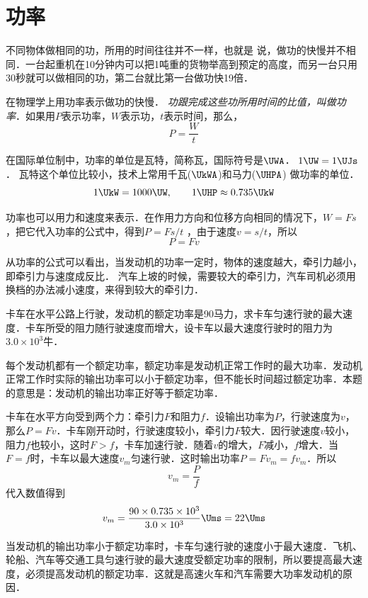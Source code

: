 \section{功率}

不同物体做相同的功，所用的时间往往并不一样，也就是
说，做功的快慢并不相同．一台起重机在10分钟内可以把1吨重的货物举高到预定的高度，而另一台只用30秒就可以做相同的功，第二台就比第一台做功快19倍．

在物理学上用功率表示做功的快慢．
\textit{功跟完成这些功所用时间的比值，叫做功率}．如果用$P$表示功率，$W$表示功，$t$表示时间，那么，
\[P=\frac{W}{t}\]

在国际单位制中，功率的单位是瓦特，简称瓦，国际符号是$\UWA$．
$1 \UW = 1 \UJs$．
瓦特这个单位比较小，技术上常用千瓦($\UkWA$)和马力($\UHPA$) %
做功率的单位．
\[1 \UkW=1000\UW,\qquad 1 \UHP \approx 0.735 \UkW \]

功率也可以用力和速度来表示．在作用力方向和位移方向相同的情况下，$W=Fs$，把它代入功率的公式中，得到$P=Fs/t$
，由于速度$v=s/t$，所以
\[P=Fv \]

从功率的公式可以看出，当发动机的功率一定时，物体的速度越大，牵引力越小，即牵引力与速度成反比．
汽车上坡的时候，需要较大的牵引力，汽车司机必须用换档的办法减小速度，来得到较大的牵引力．


	
\begin{example}
卡车在水平公路上行驶，发动机的额定功率是90马力，求卡车匀速行驶的最大速度．卡车所受的阻力随行驶速度而增大，设卡车以最大速度行驶时的阻力为$3.0\times 10^3$牛．
\end{example}

\begin{solution}
    每个发动机都有一个额定功率，额定功率是发动机正常工作时的最大功率．发动机正常工作时实际的输出功率可以小于额定功率，但不能长时间超过额定功率．本题的意思是：发动机的输出功率正好等于额定功率．

卡车在水平方向受到两个力：牵引力$F$和阻力$f$．设输出功率为$P$，行驶速度为$v$，那么$P=Fv$．卡车刚开动时，行驶速度较小，牵引力$F$较大．因行驶速度$v$较小，阻力$f$也较小，这时$F>f$，卡车加速行驶．随着$v$的增大，$F$减小，$f$增大．当$F=f$时，卡车以最大速度$v_m$匀速行驶．这时输出功率$P=Fv_m=fv_m$．所以
\[v_m=\frac{P}{f}\]
代入数值得到
\[v_m=\frac{90\times 0.735\times 10^3}{3.0\times 10^3}{\Ums}=22\Ums \]

当发动机的输出功率小于额定功率时，卡车匀速行驶的速度小于最大速度．飞机、轮船、汽车等交通工具匀速行驶的最大速度受额定功率的限制，所以要提高最大速度，必须提高发动机的额定功率．这就是高速火车和汽车需要大功率发动机的原因．
\end{solution}
	
